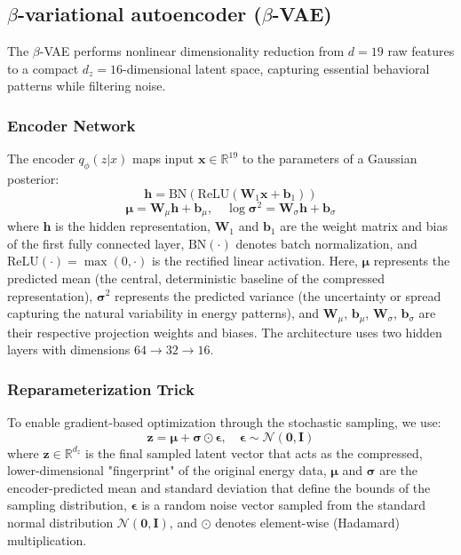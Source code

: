 \documentclass[journal]{IEEEtran}
\begin{document}
\subsection{$\beta$-variational autoencoder ($\beta$-VAE)}

The $\beta$-VAE performs nonlinear dimensionality reduction from $d = 19$ raw features to a compact $d_z = 16$-dimensional latent space, capturing essential behavioral patterns while filtering noise.

\subsubsection{Encoder Network} The encoder $q_\phi(z|x)$ maps input $\mathbf{x} \in \mathbb{R}^{19}$ to the parameters of a Gaussian posterior:
\begin{equation}
    \mathbf{h} = \text{BN}(\text{ReLU}(\mathbf{W}_1 \mathbf{x} + \mathbf{b}_1))
    \label{eq:encoder_h}
\end{equation}
\begin{equation}
    \boldsymbol{\mu} = \mathbf{W}_\mu \mathbf{h} + \mathbf{b}_\mu, \quad \log \boldsymbol{\sigma}^2 = \mathbf{W}_\sigma \mathbf{h} + \mathbf{b}_\sigma
    \label{eq:encoder_params}
\end{equation}
where $\mathbf{h}$ is the hidden representation, $\mathbf{W}_1$ and $\mathbf{b}_1$ are the weight matrix and bias of the first fully connected layer, $\text{BN}(\cdot)$ denotes batch normalization, and $\text{ReLU}(\cdot) = \max(0, \cdot)$ is the rectified linear activation. Here, $\boldsymbol{\mu}$ represents the predicted mean (the central, deterministic baseline of the compressed representation), $\boldsymbol{\sigma}^2$ represents the predicted variance (the uncertainty or spread capturing the natural variability in energy patterns), and $\mathbf{W}_\mu$, $\mathbf{b}_\mu$, $\mathbf{W}_\sigma$, $\mathbf{b}_\sigma$ are their respective projection weights and biases. The architecture uses two hidden layers with dimensions $64 \to 32 \to 16$.

\subsubsection{Reparameterization Trick} To enable gradient-based optimization through the stochastic sampling, we use:
\begin{equation}
    \mathbf{z} = \boldsymbol{\mu} + \boldsymbol{\sigma} \odot \boldsymbol{\epsilon}, \quad \boldsymbol{\epsilon} \sim \mathcal{N}(\mathbf{0}, \mathbf{I})
    \label{eq:reparam}
\end{equation}
where $\mathbf{z} \in \mathbb{R}^{d_z}$ is the final sampled latent vector that acts as the compressed, lower-dimensional "fingerprint" of the original energy data, $\boldsymbol{\mu}$ and $\boldsymbol{\sigma}$ are the encoder-predicted mean and standard deviation that define the bounds of the sampling distribution, $\boldsymbol{\epsilon}$ is a random noise vector sampled from the standard normal distribution $\mathcal{N}(\mathbf{0}, \mathbf{I})$, and $\odot$ denotes element-wise (Hadamard) multiplication.
\end{document}
